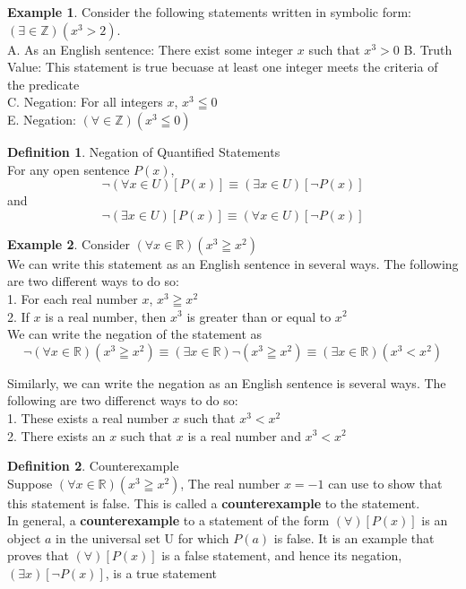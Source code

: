 \documentclass{book}
\theoremstyle{definition}
\newtheorem{definition}{Definition}[section]
\newtheorem{example}{Example}[definition]
\theoremstyle{remark}
\newcommand{\bb}[1]{\mathbb{#1}}
\begin{document}
\begin{example}
Consider the following statements written in symbolic form: $(\exists \in \bb{Z})(x^3 > 2)$. \\
A. As an English sentence: There exist some integer $x$ such that $x^3 > 0$
B. Truth Value: This statement is true becuase at least one integer meets the criteria of the predicate \\
C. Negation: For all integers $x$, $x^3 \leqq 0$ \\
E. Negation: $(\forall \in \bb{Z})(x^3 \leqq 0)$ \\
\end{example}


\begin{definition}
Negation of Quantified Statements \\

For any open sentence $P(x)$, \[ \neg(\forall x \in U)[P(x)] \equiv (\exists x \in U)[\neg P(x)]\]  and \[ \neg(\exists x \in U)[P(x)] \equiv (\forall x \in U)[\neg P(x)]\]
\end{definition}


\begin{example}
Consider $(\forall x \in \bb{R})(x^3 \geqq x^2)$ \\

We can write this statement  as an English sentence in several ways. The following are two different ways to do so: \\
1. For each real number $x$, $x^3 \geqq x^2$ \\
2. If $x$ is a real number, then $x^3$ is greater than or equal to $x^2$ \\
We can write the negation of the statement as \[ \neg (\forall x \in \bb{R})(x^3 \geqq x^2) \equiv (\exists x \in \bb{R}) \neg (x^3 \geqq x^2) \equiv (\exists x \in \bb{R})(x^3 < x^2) \]

Similarly, we can write the negation as an English sentence is several ways. The following are two differenct ways to do so: \\
1. These exists a real number $x$ such that $x^3 < x^2$ \\
2. There exists an $x$ such that $x$ is a real number and $x^3 < x^2$
\end{example}


\begin{definition}
Counterexample \\

Suppose $(\forall x \in \bb{R})(x^3 \geqq x^2)$, The real number $x = -1$ can use to show that this statement is false. This is called a {\bf counterexample} to the statement. \\
In general, a {\bf counterexample} to a statement of the form $(\forall)[P(x)]$ is an object $a$ in the universal set U for which $P(a)$ is false. It is an example that proves that $(\forall)[P(x)]$ is a false statement, and hence its negation, $(\exists x)[\neg P(x)]$, is a true statement
\end{definition}
\end{document}
